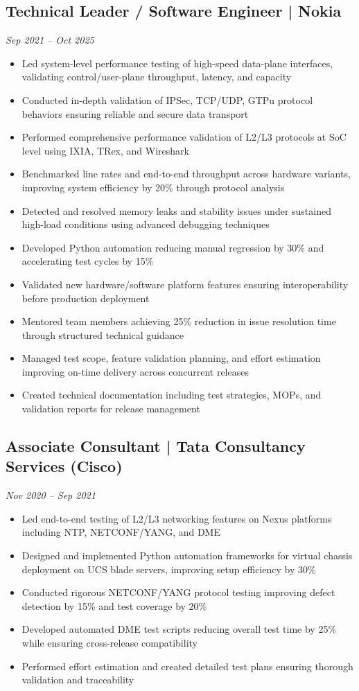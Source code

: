 \documentclass[10pt,a4paper]{article}
\begin{document}
\subsection*{Technical Leader / Software Engineer | Nokia}
\hfill \textit{Sep 2021 -- Oct 2025}
\begin{itemize}
    \item Led system-level performance testing of high-speed data-plane interfaces, validating control/user-plane throughput, latency, and capacity
    \item Conducted in-depth validation of IPSec, TCP/UDP, GTPu protocol behaviors ensuring reliable and secure data transport
    \item Performed comprehensive performance validation of L2/L3 protocols at SoC level using IXIA, TRex, and Wireshark
    \item Benchmarked line rates and end-to-end throughput across hardware variants, improving system efficiency by 20\% through protocol analysis
    \item Detected and resolved memory leaks and stability issues under sustained high-load conditions using advanced debugging techniques
    \item Developed Python automation reducing manual regression by 30\% and accelerating test cycles by 15\%
    \item Validated new hardware/software platform features ensuring interoperability before production deployment
    \item Mentored team members achieving 25\% reduction in issue resolution time through structured technical guidance
    \item Managed test scope, feature validation planning, and effort estimation improving on-time delivery across concurrent releases
    \item Created technical documentation including test strategies, MOPs, and validation reports for release management
\end{itemize}

\subsection*{Associate Consultant | Tata Consultancy Services (Cisco)}
\hfill \textit{Nov 2020 -- Sep 2021}
\begin{itemize}
    \item Led end-to-end testing of L2/L3 networking features on Nexus platforms including NTP, NETCONF/YANG, and DME
    \item Designed and implemented Python automation frameworks for virtual chassis deployment on UCS blade servers, improving setup efficiency by 30\%
    \item Conducted rigorous NETCONF/YANG protocol testing improving defect detection by 15\% and test coverage by 20\%
    \item Developed automated DME test scripts reducing overall test time by 25\% while ensuring cross-release compatibility
    \item Performed effort estimation and created detailed test plans ensuring thorough validation and traceability
\end{itemize}
\end{document}
